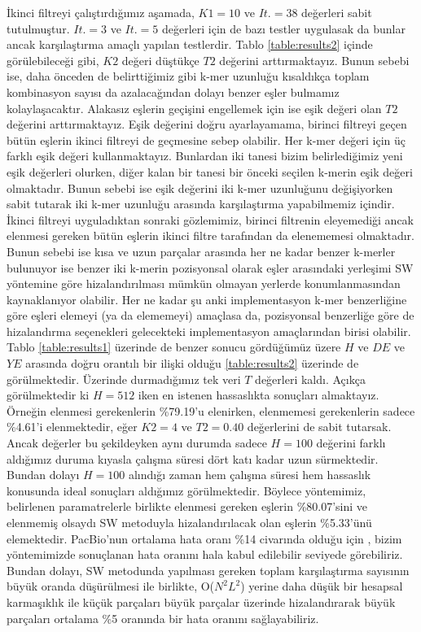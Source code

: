 İkinci filtreyi çalıştırdığımız aşamada, $K1 = 10$ ve $It. = 38$ değerleri sabit tutulmuştur. $It. = 3$ ve $It. = 5$ değerleri için de bazı testler uygulasak da bunlar ancak karşılaştırma amaçlı yapılan testlerdir. Tablo \ref{table:results2} içinde görülebileceği gibi, $K2$ değeri düştükçe $T2$ değerini arttırmaktayız. Bunun sebebi ise, daha önceden de belirttiğimiz gibi k-mer uzunluğu kısaldıkça toplam kombinasyon sayısı da azalacağından dolayı benzer eşler bulmamız kolaylaşacaktır. Alakasız eşlerin geçişini engellemek için ise eşik değeri olan $T2$ değerini arttırmaktayız. Eşik değerini doğru ayarlayamama, birinci filtreyi geçen bütün eşlerin ikinci filtreyi de geçmesine sebep olabilir. Her k-mer değeri için üç farklı eşik değeri kullanmaktayız. Bunlardan iki tanesi bizim belirlediğimiz yeni eşik değerleri olurken, diğer kalan bir tanesi bir önceki seçilen k-merin eşik değeri olmaktadır. Bunun sebebi ise eşik değerini iki k-mer uzunluğunu değişiyorken sabit tutarak iki k-mer uzunluğu arasında karşılaştırma yapabilmemiz içindir. İkinci filtreyi uyguladıktan sonraki gözlemimiz, birinci filtrenin eleyemediği ancak elenmesi gereken bütün eşlerin ikinci filtre tarafından da elenememesi olmaktadır. Bunun sebebi ise kısa ve uzun parçalar arasında her ne kadar benzer k-merler bulunuyor ise benzer iki k-merin pozisyonsal olarak eşler arasındaki yerleşimi SW yöntemine göre hizalandırılması mümkün olmayan yerlerde konumlanmasından kaynaklanıyor olabilir. Her ne kadar şu anki implementasyon k-mer benzerliğine göre eşleri elemeyi (ya da elememeyi) amaçlasa da, pozisyonsal benzerliğe göre de hizalandırma seçenekleri gelecekteki implementasyon amaçlarından birisi olabilir. Tablo \ref{table:results1} üzerinde de benzer sonucu gördüğümüz üzere $H$ ve $DE$ ve $YE$ arasında doğru orantılı bir ilişki olduğu \ref{table:results2} üzerinde de görülmektedir. Üzerinde durmadığımız tek veri $T$ değerleri kaldı. Açıkça görülmektedir ki $H = 512$ iken en istenen hassaslıkta sonuçları almaktayız. Örneğin elenmesi gerekenlerin \%79.19'u elenirken, elenmemesi gerekenlerin sadece \%4.61'i elenmektedir, eğer $K2 = 4$ ve $T2 = 0.40$ değerlerini de sabit tutarsak. Ancak değerler bu şekildeyken aynı durumda sadece $H = 100$ değerini farklı aldığımız duruma kıyasla çalışma süresi dört katı kadar uzun sürmektedir. Bundan dolayı $H = 100$ alındığı zaman hem çalışma süresi hem hassaslık konusunda ideal sonuçları aldığımız görülmektedir. Böylece yöntemimiz, belirlenen paramatrelerle birlikte elenmesi gereken eşlerin \%80.07'sini ve elenmemiş olsaydı SW metoduyla hizalandırılacak olan eşlerin \%5.33'ünü elemektedir. PacBio'nun ortalama hata oranı \%14 civarında olduğu için \cite{pacbioerr}, bizim yöntemimizde sonuçlanan hata oranını hala kabul edilebilir seviyede görebiliriz. Bundan dolayı, SW metodunda yapılması gereken toplam karşılaştırma sayısının büyük oranda düşürülmesi ile birlikte, O($N^2L^2$) yerine daha düşük bir hesapsal karmaşıklık ile küçük parçaları büyük parçalar üzerinde hizalandırarak büyük parçaları ortalama \%5 oranında bir hata oranını sağlayabiliriz.
